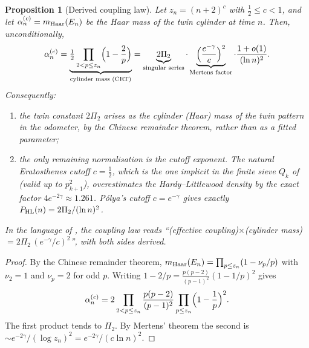 \documentclass[11pt]{amsart}
\newtheorem{proposition}[theorem]{Proposition}
\theoremstyle{definition}
\theoremstyle{remark}
\begin{document}
\begin{proposition}[Derived coupling law]\label{prop:coupling}
Let $z_n=(n+2)^c$ with $\tfrac12\le c<1$, and let $\alpha_n^{(c)}=m_{\rm Haar}(E_n)$ be the Haar mass of the twin cylinder at time $n$. Then, unconditionally,
\[
\alpha_n^{(c)}=\underbrace{\tfrac12\prod_{2<p\le z_n}\Bigl(1-\frac2p\Bigr)}_{\text{cylinder mass (CRT)}}
=\underbrace{2\Pi_2}_{\text{singular series}}\cdot\underbrace{\Bigl(\frac{e^{-\gamma}}{c}\Bigr)^{2}}_{\text{Mertens factor}}\cdot\frac{1+o(1)}{(\ln n)^{2}} .
\]
Consequently:
\begin{enumerate}
\item the twin constant $2\Pi_2$ arises as the cylinder (Haar) mass of the twin pattern in the odometer, by the Chinese remainder theorem, rather than as a fitted parameter;
\item the only remaining normalisation is the cutoff exponent. The natural Eratosthenes cutoff $c=\tfrac12$, which is the one implicit in the finite sieve $Q_k$ of \cite{Wan26} (valid up to $p_{k+1}^2$), overestimates the Hardy--Littlewood density by the exact factor $4e^{-2\gamma}\approx1.261$. Pólya's cutoff $c=e^{-\gamma}$ \cite{Pol59,BFT23} gives exactly $P_{\rm HL}(n)=2\Pi_2/(\ln n)^2$.
\end{enumerate}
In the language of \cite{Wan26}, the coupling law reads ``(effective coupling)$\times$(cylinder mass)$=2\Pi_2\,(e^{-\gamma}/c)^2$'', with both sides derived.
\end{proposition}
\begin{proof}
By the Chinese remainder theorem, $m_{\rm Haar}(E_n)=\prod_{p\le z_n}(1-\nu_p/p)$ with $\nu_2=1$ and $\nu_p=2$ for odd $p$. Writing $1-2/p=\frac{p(p-2)}{(p-1)^2}(1-1/p)^2$ gives
\[
\alpha_n^{(c)}=2\prod_{2<p\le z_n}\frac{p(p-2)}{(p-1)^2}\prod_{p\le z_n}\Bigl(1-\frac1p\Bigr)^2 .
\]
The first product tends to $\Pi_2$. By Mertens' theorem the second is $\sim e^{-2\gamma}/(\log z_n)^2=e^{-2\gamma}/(c\ln n)^2$.
\end{proof}
\end{document}
